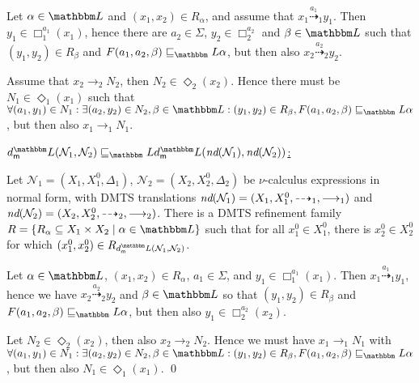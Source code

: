 \documentclass[twocolumn]{svjour3-dummy}
\newcommand*{\must}[1]{\overset{#1}{\longrightarrow}}
\newcommand*{\omust}{\mathord{\must{}}}
\newcommand*{\may}[1]{\overset{#1}{\dashrightarrow}}
\newcommand*{\omay}{\mathord{\may{}}}
\newcommand*\cN{\mathcal N}
\newcommand*\LL{\mathbbm L}
\begin{document}
  Let $\alpha\in \LL$ and $( x_1, x_2)\in R_\alpha$, and assume that
  $x_1\may{ a_1}_1 y_1$.  Then $y_1\in \Box_1^{ a_1}( x_1)$, hence there
  are $a_2\in \Sigma$, $y_2\in \Box_2^{ a_2}$ and $\beta\in \LL$ such
  that $( y_1, y_2)\in R_\beta$ and $F( a_1, a_2, \beta)\sqsubseteq_\LL
  \alpha$, but then also $x_2\may{ a_2}_2 y_2$.

  Assume that $x_2\must{}_2 N_2$, then $N_2\in \Diamond_2( x_2)$.  Hence
  there must be $N_1\in \Diamond_1( x_1)$ such that $\forall( a_1,
  y_1)\in N_1: \exists( a_2, y_2)\in N_2, \beta\in \LL:( y_1, y_2)\in
  R_\beta, F( a_1, a_2, \beta)\sqsubseteq_\LL \alpha$, but then also
  $x_1\must{}_1 N_1$.

  \medskip \noindent \underline{$\mdl( \cN_1, \cN_2)\sqsubseteq_\LL
    \mdl( \hd( \cN_1), \hd( \cN_2))$:}

  Let $\cN_1=( X_1, X_1^0, \Delta_1)$, $\cN_2=( X_2, X_2^0, \Delta_2)$
  be $\nu$-calculus expressions in normal form, with DMTS translations
  $\hd( \cN_1)=( X_1, X_1^0, \omay_1, \omust_1)$ and $\hd( \cN_2)=( X_2,
  X_2^0, \omay_2, \omust_2)$.  There is a DMTS refinement family $R=\{
  R_\alpha\subseteq X_1\times X_2\mid \alpha\in \LL\}$ such that for all
  $x_1^0\in X_1^0$, there is $x_2^0\in X_2^0$ for which $( x_1^0,
  x_2^0)\in R_{ \mdl( \cN_1, \cN_2)}$.

  Let $\alpha\in \LL$, $( x_1, x_2)\in R_\alpha$, $a_1\in \Sigma$, and
  $y_1\in \Box^{ a_1}_1( x_1)$.  Then $x_1\may{ a_1}_1 y_1$, hence we
  have $x_2\may{ a_2}_2 y_2$ and $\beta\in \LL$ so that $( y_1, y_2)\in
  R_\beta$ and $F( a_1, a_2, \beta)\sqsubseteq_\LL \alpha$, but then
  also $y_1\in \Box^{ a_2}_2( x_2)$.

  Let $N_2\in \Diamond_2( x_2)$, then also $x_2\must{}_2 N_2$.  Hence we
  must have $x_1\must{}_1 N_1$ with $\forall( a_1, y_1)\in N_1: \exists(
  a_2, y_2)\in N_2, \beta\in \LL:( y_1, y_2)\in R_\beta, F( a_1, a_2,
  \beta)\sqsubseteq_\LL \alpha$, but then also $N_1\in \Diamond_1(
  x_1)$.  \qed
\end{document}
